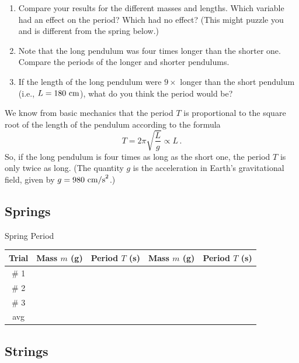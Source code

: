 \documentclass[11pt]{NSF}
\def\be{\begin{equation}}
\def\ee{\end{equation}}
\def\ben{\begin{enumerate}}
\def\een{\end{enumerate}}
\def\i{\item{}}
\begin{document}
\ben
\i Compare your results for the different masses and lengths. 
Which variable had an effect on the period? Which had no effect? 
(This might puzzle you and is different from the spring below.)

\i Note that the long pendulum was four times longer than the shorter one. 
Compare the periods of the longer and shorter pendulums.

\i If the length of the long pendulum were $9\times$ longer 
than the short pendulum (i.e., $L=180~{\rm cm}$), what do you think
the period would be?
\een

We know from basic mechanics that the period $T$ is proportional 
to the square root of the length of the pendulum according to the formula
\be
T=2\pi\sqrt{\frac{L}{g}}\propto L\,.
\ee
So, if the long pendulum is four times as long as the short one, 
the period $T$ is only twice as long. 
(The quantity $g$ is the acceleration in Earth’s gravitational field, 
given by $g = 980~{\rm cm/s}^2$.)

\subsection{Springs}


%
\begin{table}[hbtp]
\begin{center}
Spring Period\\
\begin{tabular}{| c | c | c | c | c | }
\hline
Trial & Mass $m$ (g) & Period $T$ (s) & Mass $m$ (g) & Period $T$ (s) \\
\hline
\# 1 &  &  &  &  \\
\hline
\# 2 &  &  &  &  \\
\hline
\# 3 &  &  &  &  \\
\hline
avg  &  &  &  &  \\
\hline
\end{tabular}
\label{t:1}
\end{center}
\end{table}
%

\subsection{Strings}
\end{document}

